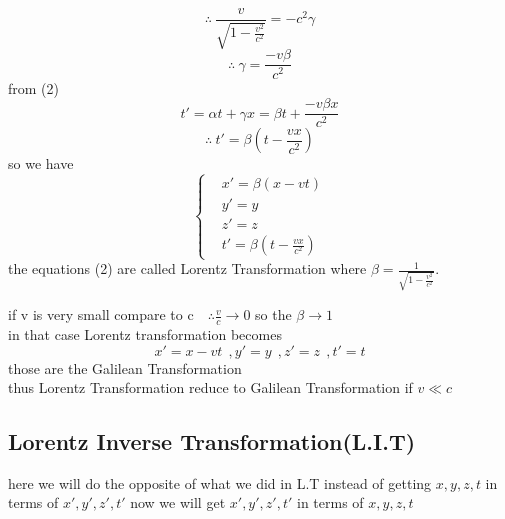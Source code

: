 \documentclass{article}
\begin{document}
\[
\therefore \ \frac{v}{\sqrt{1-\frac{v^2}{c^2}}} = -c^2 \gamma
\]
\[
\therefore \ \gamma = \frac{-v \beta}{c^2}
\]
from (2)
\[
t' = \alpha t + \gamma x = \beta t + \frac{-v \beta x}{c^2}
\]
\[
\therefore \ t' = \beta\left(t - \frac{vx}{c^2}\right)
\]
\setcounter{equation}{1}
so we have
\begin{equation}
    \begin{cases}
    &x' = \beta(x-vt)\\
    &y' =y\\
    &z' =z\\
    &t' =\beta\left(t - \frac{vx}{c^2}\right)
    \end{cases}    
\end{equation}
the equations (2) are called Lorentz Transformation where $\beta = \frac{1}{\sqrt{1-\frac{v^2}{c^2}}}$.
\begin{observation}
    if v is very small compare to c $ \ \ \ \therefore \frac{v}{c} \to 0$ so the $\beta \to 1$\\
    in that case Lorentz transformation becomes 
    \[
        x' = x-vt  \ \ ,
        y' =y   \ \ ,
        z' =z   \ \ ,
        t' =t
    \]
    those are the Galilean Transformation\\
    thus Lorentz Transformation reduce to Galilean Transformation if $v \ll c$
\end{observation}



\subsection{Lorentz Inverse Transformation(L.I.T)}
here we will do the opposite of what we did in L.T instead of getting $x,y,z,t$ in terms of $x' , y' , z' , t'$
now we will get $x' , y' , z' , t'$ in terms of $x,y,z,t$ 
\end{document}
